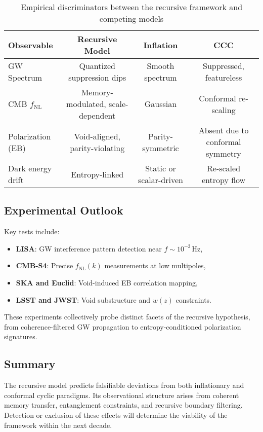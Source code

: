 \begin{table}[H]
\centering
\begin{tabular}{|l|c|c|c|}
\hline
\textbf{Observable} & \textbf{Recursive Model} & \textbf{Inflation} & \textbf{CCC} \\
\hline
GW Spectrum & Quantized suppression dips & Smooth spectrum & Suppressed, featureless \\
CMB \( f_{\text{NL}} \) & Memory-modulated, scale-dependent & Gaussian & Conformal re-scaling \\
Polarization (EB) & Void-aligned, parity-violating & Parity-symmetric & Absent due to conformal symmetry \\
Dark energy drift & Entropy-linked & Static or scalar-driven & Re-scaled entropy flow \\
\hline
\end{tabular}
\caption{Empirical discriminators between the recursive framework and competing models}
\end{table}

\subsection{Experimental Outlook}

Key tests include:
\begin{itemize}
    \item \textbf{LISA}: GW interference pattern detection near \( f \sim 10^{-3} \,\text{Hz} \),
    \item \textbf{CMB-S4}: Precise \( f_{\text{NL}}(k) \) measurements at low multipoles,
    \item \textbf{SKA and Euclid}: Void-induced EB correlation mapping,
    \item \textbf{LSST and JWST}: Void substructure and \( w(z) \) constraints.
\end{itemize}
These experiments collectively probe distinct facets of the recursive hypothesis, from coherence-filtered GW propagation to entropy-conditioned polarization signatures.

\subsection{Summary}

The recursive model predicts falsifiable deviations from both inflationary and conformal cyclic paradigms. Its observational structure arises from coherent memory transfer, entanglement constraints, and recursive boundary filtering. Detection or exclusion of these effects will determine the viability of the framework within the next decade.
